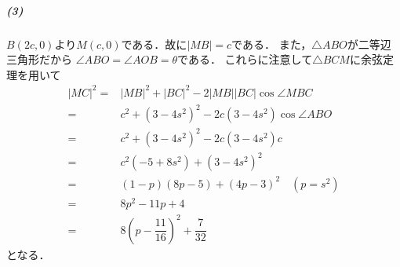 \documentclass[../../main.tex]{subfiles}
\begin{document}
\subparagraph{(3)}

$B(2c,0)$より$M(c,0)$である．故に$|MB|=c$である．
また，$\triangle ABO$が二等辺三角形だから
$\angle ABO=\angle AOB=\theta$である．
これらに注意して$\triangle BCM$に余弦定理を用いて
\begin{align}
  |MC|^2
  =&|MB|^2+|BC|^2-2|MB||BC|\cos\angle MBC  \\
  =&c^2+(3-4s^2)^2-2c(3-4s^2)\cos\angle ABO \\
  =&c^2+(3-4s^2)^2-2c(3-4s^2)c　\\
  =&c^2(-5+8s^2)+(3-4s^2)^2 \\
  =&(1-p)(8p-5)+(4p-3)^2 \quad (p=s^2)\\
  =&8p^2-11p+4  \\
  =&8\left(p-\dfrac{11}{16}\right)^2+\dfrac{7}{32}
\end{align}
となる．
\end{document}
